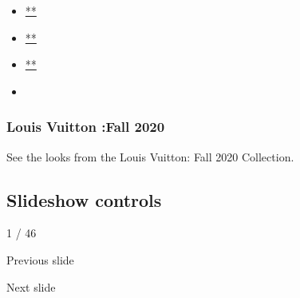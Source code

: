 \begin{itemize}
\item
  \href{https://www.facebookcorewwwi.onion/sharer.php?app_id=9869919170\&u=https\%3A\%2F\%2Fwww.nytimes3xbfgragh.onion\%2Fslideshow\%2F2020\%2F03\%2F03\%2Ffashion\%2Frunway-womens\%2Flouis-vuitton-fall-2020.html\%3Fsmid\%3Dfb-share\&name=Louis\%20Vuitton\%20\%3AFall\%202020\&redirect_uri=https\%3A\%2F\%2Fwww.facebookcorewwwi.onion\%2F}{**}
\item
  \href{https://twitter.com/intent/tweet?url=https\%3A\%2F\%2Fwww.nytimes3xbfgragh.onion\%2Fslideshow\%2F2020\%2F03\%2F03\%2Ffashion\%2Frunway-womens\%2Flouis-vuitton-fall-2020.html\%3Fsmid\%3Dtw-share\&text=Louis\%20Vuitton\%20\%3AFall\%202020}{**}
\item
  \href{mailto:?subject=nytimes3xbfgragh.onion\%3A\%20Louis\%20Vuitton\%20\%3AFall\%202020\&body=From\%20The\%20New\%20York\%20Times\%3A\%0A\%0ALouis\%20Vuitton\%20\%3AFall\%202020\%0A\%0ASee\%20the\%20looks\%20from\%20the\%20Louis\%20Vuitton\%3A\%20Fall\%202020\%20Collection.\%0A\%0Ahttps\%3A\%2F\%2Fwww.nytimes3xbfgragh.onion\%2Fslideshow\%2F2020\%2F03\%2F03\%2Ffashion\%2Frunway-womens\%2Flouis-vuitton-fall-2020.html\%3Fsmid\%3Dem-share}{**}
\item
\end{itemize}

\hypertarget{louis-vuitton-fall-2020-1}{%
\subsubsection{Louis Vuitton :Fall
2020}\label{louis-vuitton-fall-2020-1}}

See the looks from the Louis Vuitton: Fall 2020 Collection.

\hypertarget{slideshow-controls}{%
\subsection{Slideshow controls}\label{slideshow-controls}}

1 / 46

Previous slide

Next slide
